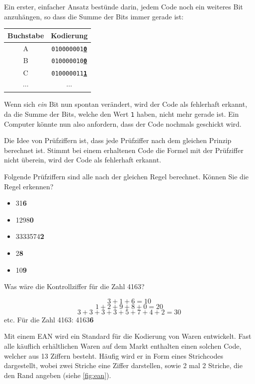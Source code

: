 Ein erster, einfacher Ansatz bestünde darin, jedem Code noch ein weiteres Bit anzuhängen, so dass die Summe der Bits immer gerade ist:

\begin{table}[H]
    \centering
    \begin{tabular}{c|c}
        Buchstabe & Kodierung                                \\\midrule\midrule
        A         & \texttt{010000001\underline{\textbf{0}}} \\\midrule
        B         & \texttt{010000010\underline{\textbf{0}}} \\\midrule
        C         & \texttt{010000011\underline{\textbf{1}}} \\\midrule
        $\cdots$  & $\cdots$
    \end{tabular}
\end{table}

Wenn sich \textit{ein} Bit nun spontan verändert, wird der Code als fehlerhaft erkannt, da die Summe der Bits, welche den Wert \texttt{1} haben, nicht mehr gerade ist. Ein Computer könnte nun also anfordern, dass der Code nochmals geschickt wird.

Die Idee von Prüfziffern ist, dass jede Prüfziffer nach dem gleichen Prinzip berechnet ist. Stimmt bei einem erhaltenen Code die Formel mit der Prüfziffer nicht überein, wird der Code als fehlerhaft erkannt.
\begin{myexercise}
    Folgende Prüfziffern sind alle nach der gleichen Regel berechnet. Können Sie die Regel erkennen?
    \begin{itemize}
        \item 31\textbf{6}
        \item 1298\textbf{0}
        \item 3333574\textbf{2}
        \item 2\textbf{8}
        \item 10\textbf{9}
    \end{itemize}
    Was wäre die Kontrollziffer für die Zahl 4163?

    \begin{myanswer}
        \[3 + 1 + 6 = 10\]
        \[1 + 2 + 9 + 8 + 0 = 20\]
        \[3 + 3 + 3 + 3 + 5 + 7 + 4 + 2=30\]
        etc.
        Für die Zahl 4163: 4163\textbf{6}
    \end{myanswer}
\end{myexercise}

Mit einem \gls{EAN} wird ein Standard für die Kodierung von Waren entwickelt. Fast alle käuflich erhältlichen Waren auf dem Markt enthalten einen solchen Code, welcher aus 13 Ziffern besteht. Häufig wird er in Form eines Strichcodes dargestellt, wobei zwei Striche eine Ziffer darstellen, sowie 2 mal 2 Striche, die den Rand angeben (siehe \cref{fig:ean}).

